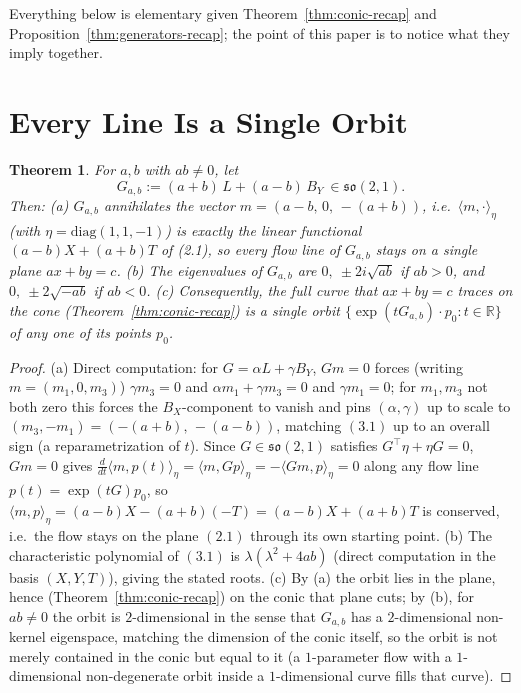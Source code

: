 \documentclass[11pt]{amsart}
\newtheorem{theorem}{Theorem}[section]
\theoremstyle{remark}
\begin{document}
Everything below is elementary given Theorem~\ref{thm:conic-recap} and Proposition~\ref{thm:generators-recap}; the point of this paper is to notice what they imply together.

\section{Every Line Is a Single Orbit}

\begin{theorem}\label{thm:orbit}
For $a,b$ with $ab\ne0$, let
\begin{equation}
G_{a,b}:=(a+b)\,L+(a-b)\,B_Y\ \in\mathfrak{so}(2,1). \tag{3.1}
\end{equation}
Then: \textup{(a)} $G_{a,b}$ annihilates the vector $m=(a-b,\,0,\,-(a+b))$, i.e.\ $\langle m,\cdot\rangle_\eta$ (with $\eta=\mathrm{diag}(1,1,-1)$) is exactly the linear functional $(a-b)X+(a+b)T$ of \textup{(2.1)}, so every flow line of $G_{a,b}$ stays on a single plane $ax+by=c$. \textup{(b)} The eigenvalues of $G_{a,b}$ are $0,\ \pm2i\sqrt{ab}$ if $ab>0$, and $0,\ \pm2\sqrt{-ab}$ if $ab<0$. \textup{(c)} Consequently, the full curve that $ax+by=c$ traces on the cone (Theorem~\ref{thm:conic-recap}) is a single orbit $\{\exp(tG_{a,b})\cdot p_0: t\in\mathbb R\}$ of any one of its points $p_0$.
\end{theorem}

\begin{proof}
(a) Direct computation: for $G=\alpha L+\gamma B_Y$, $Gm=0$ forces (writing $m=(m_1,0,m_3)$) $\gamma m_3=0$ and $\alpha m_1+\gamma m_3=0$ and $\gamma m_1=0$; for $m_1,m_3$ not both zero this forces the $B_X$-component to vanish and pins $(\alpha,\gamma)$ up to scale to $(m_3,-m_1)=(-(a+b),\,-(a-b))$, matching $(3.1)$ up to an overall sign (a reparametrization of $t$). Since $G\in\mathfrak{so}(2,1)$ satisfies $G^\top\eta+\eta G=0$, $Gm=0$ gives $\frac{d}{dt}\langle m,p(t)\rangle_\eta=\langle m,Gp\rangle_\eta=-\langle Gm,p\rangle_\eta=0$ along any flow line $p(t)=\exp(tG)p_0$, so $\langle m,p\rangle_\eta=(a-b)X-(a+b)(-T)=(a-b)X+(a+b)T$ is conserved, i.e.\ the flow stays on the plane $(2.1)$ through its own starting point.
(b) The characteristic polynomial of $(3.1)$ is $\lambda(\lambda^2+4ab)$ (direct computation in the basis $(X,Y,T)$), giving the stated roots.
(c) By (a) the orbit lies in the plane, hence (Theorem~\ref{thm:conic-recap}) on the conic that plane cuts; by (b), for $ab\ne0$ the orbit is $2$-dimensional in the sense that $G_{a,b}$ has a $2$-dimensional non-kernel eigenspace, matching the dimension of the conic itself, so the orbit is not merely contained in the conic but equal to it (a $1$-parameter flow with a $1$-dimensional non-degenerate orbit inside a $1$-dimensional curve fills that curve).
\end{proof}
\end{document}
